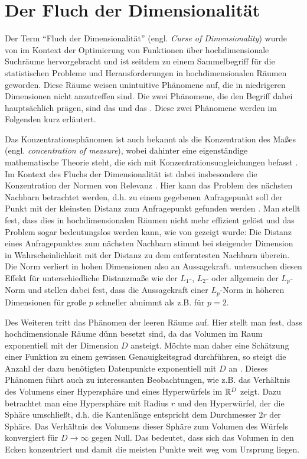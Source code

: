 \section{Der Fluch der Dimensionalität}
\label{ch:Dimensionsreduktion:FluchDerDim}

Der Term \enquote{Fluch der Dimensionalität} (engl. \textit{Curse of Dimensionality}) wurde von
\textcite{Bellman.1961} im Kontext der Optimierung von Funktionen über hochdimensionale Suchräume
hervorgebracht und ist seitdem zu einem Sammelbegriff für die statistischen Probleme und
Herausforderungen in hochdimensionalen Räumen geworden. Diese Räume weisen unintuitive Phänomene
auf, die in niedrigeren Dimensionen nicht anzutreffen sind. Die zwei Phänomene, die den Begriff
dabei hauptsächlich prägen, sind das  und das
 \parencite[6 -- 9]{Lee.2007}. Diese zwei Phänomene werden im Folgenden kurz erläutert.

Das Konzentrationsphänomen ist auch bekannt als die Konzentration des Maßes (engl.
\textit{concentration of measure}), wobei dahinter eine eigenständige mathematische Theorie steht,
die sich mit Konzentrationsungleichungen befasst \parencite{Ledoux.2001}. Im Kontext des Fluchs der Dimensionalität ist dabei insbesondere die
Konzentration der Normen von Relevanz \parencites[siehe z.B.][]{Kumari.2017}{Verleysen.2005}. Hier kann das Problem des nächsten Nachbarn
betrachtet werden, d.h. zu einem gegebenen Anfragepunkt soll der Punkt mit der kleinsten Distanz
zum Anfragepunkt gefunden werden \parencite[217]{Beyer.1999}. Man stellt fest, dass dies in hochdimensionalen Räumen nicht mehr
effizient gelöst und das Problem sogar bedeutungslos werden kann, wie von \textcite{Beyer.1999}
gezeigt wurde: Die Distanz eines Anfragepunktes zum nächsten Nachbarn stimmt bei steigender
Dimension in Wahrscheinlichkeit mit der Distanz zu dem entferntesten Nachbarn überein. Die Norm
verliert in hohen Dimensionen also an Aussagekraft. \textcite{Aggarwal.2001} untersuchen diesen
Effekt für unterschiedliche Distanzmaße wie der $L_1$-, $L_2$- oder allgemein der $L_p$-Norm und
stellen dabei fest, dass die Aussagekraft einer $L_p$-Norm in höheren Dimensionen für große $p$
schneller abnimmt als z.B. für $p = 2$.

Des Weiteren tritt das Phänomen der leeren Räume auf. Hier stellt man fest, dass hochdimensionale
Räume dünn besetzt sind, da das Volumen im Raum exponentiell mit der Dimension $D$ ansteigt. Möchte
man daher eine Schätzung einer Funktion zu einem gewissen Genauigkeitsgrad durchführen, so steigt
die Anzahl der dazu benötigten Datenpunkte exponentiell mit $D$ an \parencite[6]{Lee.2007}. Dieses Phänomen führt auch zu interessanten Beobachtungen, wie z.B. das
Verhältnis des Volumens einer Hypersphäre und eines Hyperwürfels im $\mathbb{R}^D$ zeigt. Dazu
betrachtet man eine Hypersphäre mit Radius $r$ und den Hyperwürfel, der die Sphäre umschließt, d.h.
die Kantenlänge entspricht dem Durchmesser $2r$ der Sphäre. Das Verhältnis des Volumens dieser
Sphäre zum Volumen des Würfels konvergiert für $D \rightarrow \infty$ gegen Null. Das bedeutet,
dass sich das Volumen in den Ecken konzentriert \parencite[6 -- 7]{Lee.2007} und damit die meisten Punkte weit weg vom Ursprung liegen.


